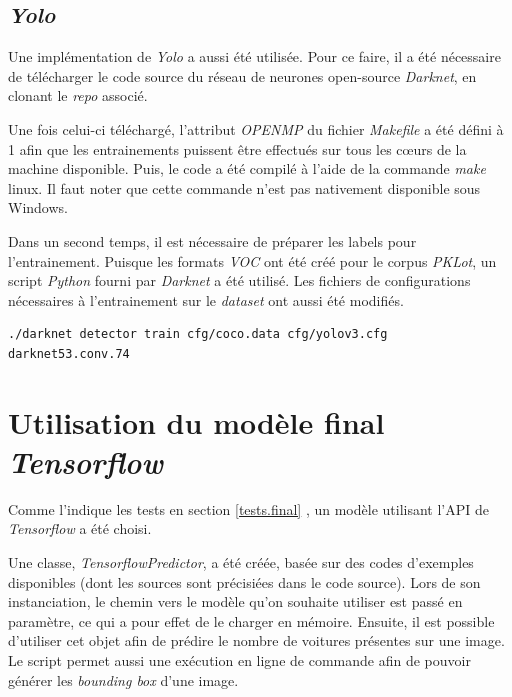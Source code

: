\subsection{\textit{Yolo}}
Une implémentation de \textit{Yolo} a aussi été utilisée. Pour ce faire, il a été nécessaire de télécharger le code source du réseau de neurones open-source \textit{Darknet}\autocite{lib:yolo}, en clonant le \textit{repo} associé.

Une fois celui-ci téléchargé, l'attribut \textit{OPENMP} du fichier \textit{Makefile} a été défini à 1 afin que les entrainements puissent être effectués sur tous les cœurs de la machine disponible. Puis, le code a été compilé à l'aide de la commande \textit{make} linux. Il faut noter que cette commande n'est pas nativement disponible sous Windows.

Dans un second temps, il est nécessaire de préparer les labels pour l'entrainement. Puisque les formats \textit{VOC} ont été créé pour le corpus \textit{PKLot}, un script \textit{Python} fourni par \textit{Darknet} a été utilisé. Les fichiers de configurations nécessaires à l'entrainement sur le \textit{dataset} ont aussi été modifiés. 

\begin{lstlisting}[caption={Exécution d'un entrainement à l'aide de \textit{Yolo}}, label={lst:yolo_train}, numbers=none] 
./darknet detector train cfg/coco.data cfg/yolov3.cfg darknet53.conv.74
\end{lstlisting}


\section{Utilisation du modèle final \textit{Tensorflow}} 
Comme l'indique les tests en section \ref{tests.final} , un modèle utilisant l'API de \textit{Tensorflow} a été choisi. 

Une classe, \textit{TensorflowPredictor}, a été créée, basée sur des codes d'exemples disponibles (dont les sources sont précisiées dans le code source). Lors de son instanciation, le chemin vers le modèle qu'on souhaite utiliser est passé en paramètre, ce qui a pour effet de le charger en mémoire. Ensuite, il est possible d'utiliser cet objet afin de prédire le nombre de voitures présentes sur une image. Le script permet aussi une exécution en ligne de commande afin de pouvoir générer les \textit{bounding box} d'une image.




